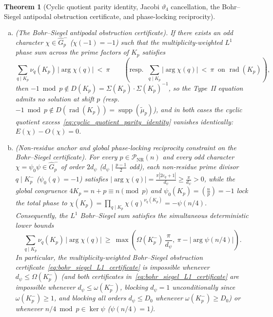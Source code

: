 \documentclass[11pt, a4paper]{article}
\theoremstyle{plain}
\newtheorem{theorem}{Theorem}[section]
\theoremstyle{definition}
\newcommand{\leg}[2]{\left(\frac{#1}{#2}\right)}
\begin{document}
\begin{theorem}[Cyclic quotient parity identity, Jacobi $\vartheta_4$ cancellation, the Bohr--Siegel antipodal obstruction certificate, and phase-locking reciprocity]
\begin{enumerate}[(a)]
    \item \emph{(The Bohr--Siegel antipodal obstruction certificate).} If there exists an odd character $\chi\in\widehat{G}_p^{-}$ ($\chi(-1)=-1$) such that the multiplicity-weighted $L^{1}$ phase sum across the prime factors of $K_p$ satisfies
    \begin{equation}\label{eq:bohr_siegel_L1_certificate}
    \sum_{q\mid K_p}\nu_q(K_p)\,\big|\arg\chi(q)\big|\ <\ \pi\qquad\left(\text{resp.\ }\ \sum_{q\mid K_p}\big|\arg\chi(q)\big|\ <\ \pi\ \text{ on }\operatorname{rad}(K_p)\right),
    \end{equation}
    then $-1\bmod p\notin D(K_p)=\Sigma(K_p)\cdot\Sigma(K_p)^{-1}$, so the Type~II equation admits no solution at shift $p$ (resp.\ $-1\bmod p\notin D(\operatorname{rad}(K_p))=\operatorname{supp}(\widetilde{\mu}_p)$), and in both cases the cyclic quotient excess~\eqref{eq:cyclic_quotient_parity_identity} vanishes identically: $E(\chi)-O(\chi)=0$.

    \item \emph{(Non-residue anchor and global phase-locking reciprocity constraint on the Bohr--Siegel certificate).} For every $p\in\mathcal{P}_{\mathrm{NR}}(n)$ and every odd character $\chi=\psi_0\psi\in\widehat{G}_p^{-}$ of order $2d_{\psi}$ ($d_{\psi}\mid\frac{p-1}{2}$ odd), each non-residue prime divisor $q\mid K_p^{-}$ ($\psi_0(q)=-1$) satisfies $|\arg\chi(q)|=\frac{\pi|2c_q+1|}{d_{\psi}}\ge\frac{\pi}{d_{\psi}}>0$, while the global congruence $4K_p=n+p\equiv n\pmod p$ and $\psi_0(K_p)=\leg{n}{p}=-1$ lock the total phase to $\chi(K_p)=\prod_{q\mid K_p}\chi(q)^{\nu_q(K_p)}=-\psi(n/4)$. Consequently, the $L^{1}$ Bohr--Siegel sum satisfies the simultaneous deterministic lower bounds
    \begin{equation}\label{eq:non_residue_and_reciprocity_lower_bound}
    \sum_{q\mid K_p}\nu_q(K_p)\,\big|\arg\chi(q)\big|\ \ge\ \max\!\left(\Omega(K_p^{-})\,\frac{\pi}{d_{\psi}},\ \pi-\big|\arg\psi(n/4)\big|\right).
    \end{equation}
    In particular, the multiplicity-weighted Bohr--Siegel obstruction certificate~\eqref{eq:bohr_siegel_L1_certificate} is \emph{impossible} whenever $d_{\psi}\le\Omega(K_p^{-})$ (and both certificates in~\eqref{eq:bohr_siegel_L1_certificate} are impossible whenever $d_{\psi}\le\omega(K_p^{-})$, blocking $d_{\psi}=1$ unconditionally since $\omega(K_p^{-})\ge1$, and blocking all orders $d_{\psi}\le D_0$ whenever $\omega(K_p^{-})\ge D_0$) or whenever $n/4\bmod p\in\ker\psi$ ($\psi(n/4)=1$).
\end{enumerate}
\end{theorem}
\end{document}
